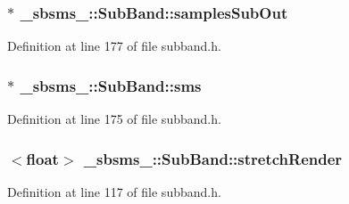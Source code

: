 \subsubsection[{\texorpdfstring{samples\+Sub\+Out}{samplesSubOut}}]{$\ast$ \+\_\+sbsms\+\_\+\+::\+Sub\+Band\+::samples\+Sub\+Out\hspace{0.3cm}{\ttfamily [protected]}}\hypertarget{class__sbsms___1_1_sub_band_adf2de2663db8f6552337ae52ec4bff46}{}\label{class__sbsms___1_1_sub_band_adf2de2663db8f6552337ae52ec4bff46}


Definition at line 177 of file subband.\+h.

\subsubsection[{\texorpdfstring{sms}{sms}}]{$\ast$ \+\_\+sbsms\+\_\+\+::\+Sub\+Band\+::sms\hspace{0.3cm}{\ttfamily [protected]}}\hypertarget{class__sbsms___1_1_sub_band_a67f4ce6733402c5a3edcf4075d99fe9e}{}\label{class__sbsms___1_1_sub_band_a67f4ce6733402c5a3edcf4075d99fe9e}


Definition at line 175 of file subband.\+h.

\subsubsection[{\texorpdfstring{stretch\+Render}{stretchRender}}]{$<$float$>$ \+\_\+sbsms\+\_\+\+::\+Sub\+Band\+::stretch\+Render\hspace{0.3cm}{\ttfamily [protected]}}\hypertarget{class__sbsms___1_1_sub_band_ae60d27056b5cc96a75ab7bd14e3bd66a}{}\label{class__sbsms___1_1_sub_band_ae60d27056b5cc96a75ab7bd14e3bd66a}


Definition at line 117 of file subband.\+h.

